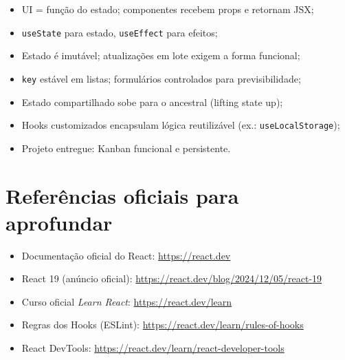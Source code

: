 \begin{itemize}[leftmargin=*, itemsep=0.3em]
  \item UI = função do estado; componentes recebem props e retornam JSX;
  \item \texttt{useState} para estado, \texttt{useEffect} para efeitos;
  \item Estado é imutável; atualizações em lote exigem a forma funcional;
  \item \texttt{key} estável em listas; formulários controlados para previsibilidade;
  \item Estado compartilhado sobe para o ancestral (lifting state up);
  \item Hooks customizados encapsulam lógica reutilizável (ex.: \texttt{useLocalStorage});
  \item Projeto entregue: Kanban funcional e persistente.
\end{itemize}

\section{Referências oficiais para aprofundar}

\begin{itemize}[leftmargin=*, itemsep=0.3em]
  \item Documentação oficial do React: \url{https://react.dev}
  \item React 19 (anúncio oficial): \url{https://react.dev/blog/2024/12/05/react-19}
  \item Curso oficial \emph{Learn React}: \url{https://react.dev/learn}
  \item Regras dos Hooks (ESLint): \url{https://react.dev/learn/rules-of-hooks}
  \item React DevTools: \url{https://react.dev/learn/react-developer-tools}
\end{itemize}
